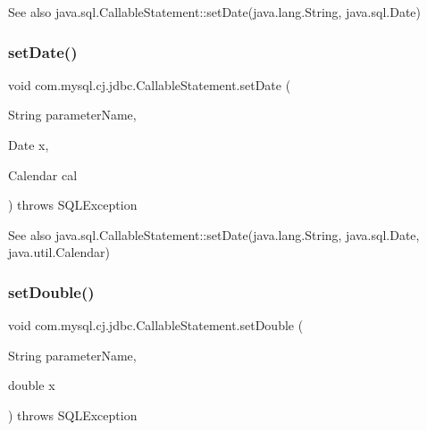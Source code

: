 \begin{DoxySeeAlso}{See also}
java.\+sql.\+Callable\+Statement\+::set\+Date(java.\+lang.\+String, java.\+sql.\+Date) 
\end{DoxySeeAlso}
\mbox{\label{classcom_1_1mysql_1_1cj_1_1jdbc_1_1_callable_statement_a4acf89e04d11195ab7c45dce46e7c367}} 
\subsubsection{\texorpdfstring{set\+Date()}{setDate()}\hspace{0.1cm}{\footnotesize\ttfamily [2/2]}}
{\footnotesize\ttfamily void com.\+mysql.\+cj.\+jdbc.\+Callable\+Statement.\+set\+Date (\begin{DoxyParamCaption}\item[{String}]{parameter\+Name,  }\item[{Date}]{x,  }\item[{Calendar}]{cal }\end{DoxyParamCaption}) throws S\+Q\+L\+Exception}

\begin{DoxySeeAlso}{See also}
java.\+sql.\+Callable\+Statement\+::set\+Date(java.\+lang.\+String, java.\+sql.\+Date, java.\+util.\+Calendar) 
\end{DoxySeeAlso}
\mbox{\label{classcom_1_1mysql_1_1cj_1_1jdbc_1_1_callable_statement_abd5c1f562e6a0f06c4ef239a208d1471}} 
\subsubsection{\texorpdfstring{set\+Double()}{setDouble()}}
{\footnotesize\ttfamily void com.\+mysql.\+cj.\+jdbc.\+Callable\+Statement.\+set\+Double (\begin{DoxyParamCaption}\item[{String}]{parameter\+Name,  }\item[{double}]{x }\end{DoxyParamCaption}) throws S\+Q\+L\+Exception}


